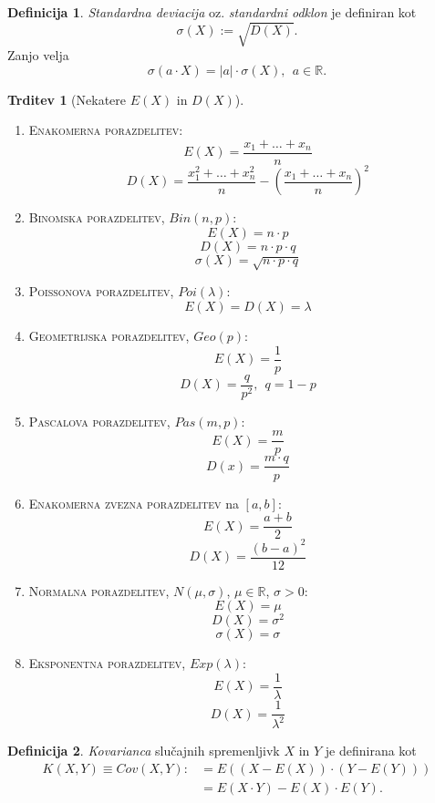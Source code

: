 \documentclass[11pt]{article}
\theoremstyle{definition}
\newtheorem{definicija}{Definicija}[section]
\theoremstyle{definition}
\newtheorem{trditev}{Trditev}[section]
\theoremstyle{definition}
\begin{document}
\begin{definicija}

\textit{Standardna deviacija} oz. \textit{standardni odklon} je definiran kot
$$\sigma(X) := \sqrt{D(X)}.$$
Zanjo velja
$$\sigma(a \cdot X) = |a| \cdot \sigma(X), ~~a \in \mathbb{R}.$$

\end{definicija}
\vspace{0.5cm}

\begin{trditev}[Nekatere $E(X)$ in $D(X)$]
~
\begin{enumerate}
	\item \textsc{Enakomerna porazdelitev}:
	$$E(X) = \frac{x_1 + \ldots + x_n}{n}$$
	$$D(X) = \frac{x_1^2 + \ldots + x_n^2}{n} - \left( \frac{x_1 + \ldots + x_n}{n} \right)^2$$
	\item \textsc{Binomska porazdelitev}, $Bin(n, p)$:
	$$E(X) = n \cdot p$$
	$$D(X) = n \cdot p \cdot q$$
	$$\sigma(X) = \sqrt{n \cdot p \cdot q}$$
	\item \textsc{Poissonova porazdelitev}, $Poi(\lambda)$:
	$$E(X) = D(X) = \lambda$$
	\item \textsc{Geometrijska porazdelitev}, $Geo(p)$:
	$$E(X) = \frac{1}{p}$$
	$$D(X) = \frac{q}{p^2}, ~~q = 1 - p$$
	\item \textsc{Pascalova porazdelitev}, $Pas(m, p)$:
	$$E(X) = \frac{m}{p}$$
	$$D(x) = \frac{m \cdot q}{p}$$
	\item \textsc{Enakomerna zvezna porazdelitev} na $[a, b]$:
	$$E(X) = \frac{a + b}{2}$$ $$
	D(X) = \frac{(b-a)^2}{12}$$
	\item \textsc{Normalna porazdelitev}, $N(\mu, \sigma)$, $\mu \in \mathbb{R}$, $\sigma > 0$:
	$$E(X) = \mu$$
	$$D(X) = \sigma^2$$
	$$\sigma(X) = \sigma$$
	\item \textsc{Eksponentna porazdelitev}, $Exp(\lambda)$:
	$$E(X) = \frac{1}{\lambda}$$
	$$D(X) = \frac{1}{\lambda^2}$$
\end{enumerate}

\end{trditev}
\vspace{0.5cm}

\begin{definicija}

\textit{Kovarianca} slučajnih spremenljivk $X$ in $Y$ je definirana kot 
\begin{align*}
K(X, Y) \equiv Cov(X, Y) :&= E((X - E(X)) \cdot (Y - E(Y))) \\
&= E(X \cdot Y) - E(X) \cdot E(Y).
\end{align*}


\end{definicija}
\vspace{0.5cm}

\end{document}
